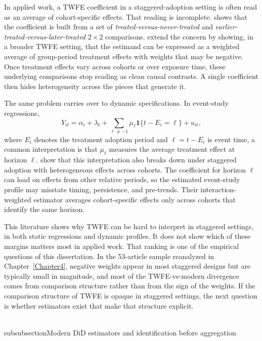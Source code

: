 \documentclass[11pt]{article}
\begin{document}
In applied work, a TWFE coefficient in a staggered-adoption setting is often read as an average of cohort-specific effects. That reading is incomplete. \textcite{goodman2021difference} shows that the coefficient is built from a set of \textit{treated-versus-never-treated} and \textit{earlier-treated-versus-later-treated} \(2\times 2\) comparisons. \textcite{dechaisemartin2020twfe} extend the concern by showing, in a broader TWFE setting, that the estimand can be expressed as a weighted average of group-period treatment effects with weights that may be negative. Once treatment effects vary across cohorts or over exposure time, these underlying comparisons stop reading as clean causal contrasts. A single coefficient then hides heterogeneity across the pieces that generate it.

The same problem carries over to dynamic specifications. In event-study regressions,
\begin{equation}
Y_{it}
=
\alpha_i + \lambda_t
+ \sum_{\ell \neq -1} \mu_{\ell}\mathbf{1}\{t-E_i=\ell\}
+ u_{it},
\label{eq:twfe_event_study_short}
\end{equation}
where \(E_i\) denotes the treatment adoption period and \(\ell=t-E_i\) is event time, a common interpretation is that \(\mu_\ell\) measures the average treatment effect at horizon \(\ell\). \textcite{sun2021estimating} show that this interpretation also breaks down under staggered adoption with heterogeneous effects across cohorts. The coefficient for horizon \(\ell\) can load on effects from other relative periods, so the estimated event-study profile may misstate timing, persistence, and pre-trends. Their interaction-weighted estimator averages cohort-specific effects only across cohorts that identify the same horizon.

This literature shows why TWFE can be hard to interpret in staggered settings, in both static regressions and dynamic profiles. It does not show which of these margins matters most in applied work. That ranking is one of the empirical questions of this dissertation. In the 53-article sample reanalyzed in Chapter~\ref{Chapter4}, negative weights appear in most staggered designs but are typically small in magnitude, and most of the TWFE-vs-modern divergence comes from comparison structure rather than from the sign of the weights. If the comparison structure of TWFE is opaque in staggered settings, the next question is whether estimators exist that make that structure explicit.


\\subsubsection{Modern DiD estimators and identification before aggregation}
\end{document}
